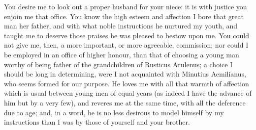 You desire me to look out a proper husband for your niece: it is with
justice you enjoin me that office. You know the high esteem and affection
I bore that great man her father, and with what noble instructions he
nurtured my youth, and taught me to deserve those praises he was pleased
to bestow upon me. You could not give me, then, a more important, or more
agreeable, commission; nor could I be employed in an office of higher
honour, than that of choosing a young man worthy of being father of the
grandchildren of Rusticus Arulenus; a choice I should be long in
determining, were I not acquainted with Minutius Aemilianus, who seems
formed for our purpose. He loves me with all that warmth of affection
which is usual between young men of equal years (as indeed I have the
advance of him but by a very few), and reveres me at the same time, with
all the deference due to age; and, in a word, he is no less desirous to
model himself by my instructions than I was by those of yourself and your
brother.

